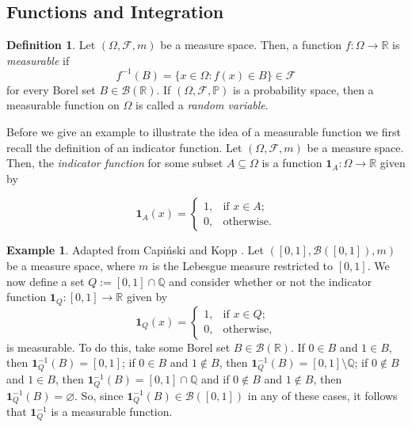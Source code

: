 \documentclass[a4paper,11pt]{article}
\theoremstyle{plain}
\theoremstyle{definition}
\newtheorem{definition}[theorem]{Definition}
\newtheorem{example}[theorem]{Example}
\begin{document}
\subsection{Functions and Integration}

\begin{definition}\citep[p.~94]{RMD}
Let $(\Omega,\mathcal{F},m)$ be a measure space. Then, a function $f:\Omega \rightarrow \mathbb{R}$ is \textit{measurable} if
\[
f^{-1}(B) = \{x \in \Omega : f(x) \in B\} \in \mathcal{F}
\]
for every Borel set $B \in \mathcal{B}(\mathbb{R})$. If $(\Omega,\mathcal{F},\mathbb{P})$ is a probability space, then a measurable function on $\Omega$ is called a \textit{random variable}.
\end{definition}

Before we give an example to illustrate the idea of a measurable function we first recall the definition of an indicator function. Let $(\Omega, \mathcal{F}, m)$ be a measure space. Then, the \textit{indicator function} for some subset $A \subseteq \Omega$ is a function $\mathbf{1}_A:\Omega \to \mathbb{R}$ given by

\[
\mathbf{1}_A(x) = 
\begin{cases}
  1, & \text{if $x \in A$;} \\
  0, & \text{otherwise.}
\end{cases}
\]

\begin{example}\label{example:measfunc} Adapted from Capi\'nski and Kopp \citep[p.~59]{MC}.
Let $([0,1],\mathcal{B}([0,1]),m)$ be a measure space, where $m$ is the Lebesgue measure restricted to $[0,1]$. We now define a set $Q := [0,1]\cap\mathbb{Q}$ and consider whether or not the indicator function $\mathbf{1}_Q:[0,1] \rightarrow \mathbb{R}$ given by
\[
\mathbf{1}_Q(x) = 
\begin{cases}
  1, & \text{if $x \in Q$;}\\
  0, & \text{otherwise,}
\end{cases}
\]
is measurable. To do this, take some Borel set $B \in \mathcal{B}(\mathbb{R})$. If $0 \in B$ and $1 \in B$, then $\mathbf{1}_Q^{-1}(B) = [0,1]$; if $0 \in B$ and $1 \notin B$, then $\mathbf{1}_Q^{-1}(B) = [0,1] \setminus \mathbb{Q}$; if $0 \notin B$ and $1 \in B$, then $\mathbf{1}_Q^{-1}(B) = [0,1] \cap \mathbb{Q}$ and if $0 \notin B$ and $1 \notin B$, then $\mathbf{1}_Q^{-1}(B) = \varnothing$. So, since $\mathbf{1}_Q^{-1}(B) \in \mathcal{B}([0,1])$ in any of these cases, it follows that $\mathbf{1}_Q^{-1}$ is a measurable function.
\end{example}
\end{document}

